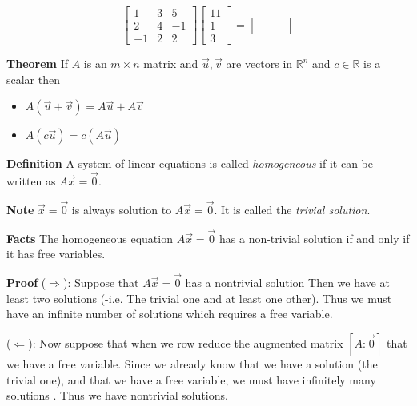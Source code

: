   \begin{frame}[fragile]
\[
 \left[\begin{array}{rrr}
  1 & 3 & 5 \\
  2 & 4  & -1 \\
  -1 & 2 & 2 
 \end{array}\right]
\left[\begin{array}{r}
 11 \\ 1 \\ 3
\end{array}\right]
=
\left[\begin{array}{r}
 \qquad \\ \qquad \\  \qquad
\end{array}\right]
\]

\end{frame}

  \begin{frame}[fragile]
\textbf{Theorem} If $A$ is an $m \times n$ matrix and $\vec{u}, \vec{v}$ are vectors in 
$\mathbb R^n$ and  $c\in \mathbb R$ is a scalar then 
 \begin{itemize}
  \item $A ( \vec{u} + \vec{v}) = A \vec{u} + A\vec{v}$
  \item $A(c\vec{u}) = c(A\vec{u})$
 \end{itemize}


\end{frame}

  \begin{frame}[fragile]
\textbf{Definition}  
 A system of linear equations is called {\em homogeneous} if it can be written as 
 $A \vec{x} = \vec{0}$.


\textbf{Note}
$\vec{x}= \vec{0}$ is always solution to $A\vec{x}= \vec{0}$.
It is called the {\em trivial solution}.

\end{frame}

  \begin{frame}[fragile]
\textbf{Facts}
The homogeneous equation $A \vec{x} = \vec{0}$ has a non-trivial 
solution if and only if it has free variables.


\textbf{Proof}
($\Rightarrow$):  Suppose that $A \vec{x} = \vec{0}$ has a nontrivial solution
Then we have at least two solutions (-i.e. The trivial one and at least one other).
Thus we must have an infinite number of solutions which requires a free variable. 

($\Leftarrow$):  Now suppose that when we row reduce the augmented matrix $[A : \vec{0}]$ that we have a free variable. 
Since we already know that we have a solution (the trivial one), and that we have a free variable, we must have infinitely many solutions . 
Thus we have nontrivial solutions.

\end{frame}

